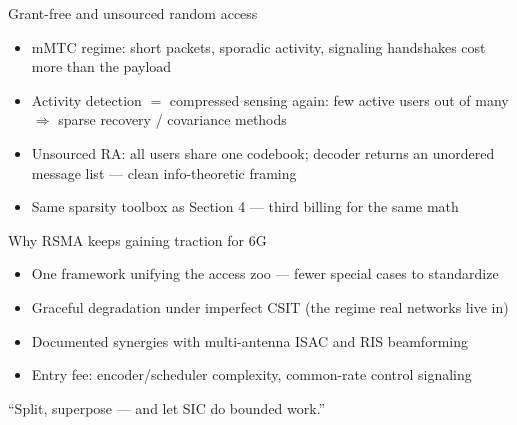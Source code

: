 \begin{frame}{Grant-free and unsourced random access}
  \begin{itemize}\itemsep2pt
    \item mMTC regime: short packets, sporadic activity, signaling handshakes
          cost more than the payload
    \item Activity detection $=$ \alert{compressed sensing} again: few active
          users out of many $\Rightarrow$ sparse recovery / covariance methods
    \item Unsourced RA: all users share one codebook; decoder returns an
          unordered message list --- clean info-theoretic framing
    \item Same sparsity toolbox as Section 4 --- third billing for the same math
  \end{itemize}
\end{frame}

\begin{frame}{Why RSMA keeps gaining traction for 6G}
  \begin{itemize}\itemsep2pt
    \item One framework unifying the access zoo --- fewer special cases to
          standardize
    \item Graceful degradation under \alert{imperfect CSIT} (the regime real
          networks live in)
    \item Documented synergies with multi-antenna ISAC and RIS beamforming
    \item Entry fee: encoder/scheduler complexity, common-rate control
          signaling
  \end{itemize}
  \vspace{2mm}
  \centering\alert{``Split, superpose --- and let SIC do bounded work.''}
\end{frame}
